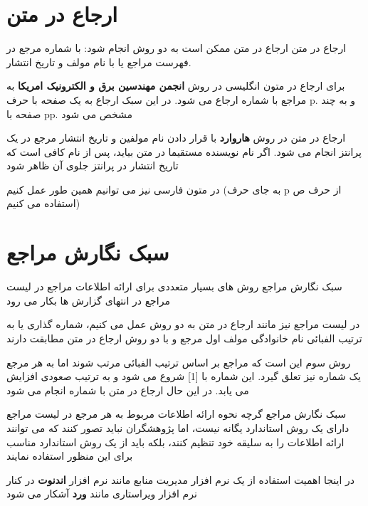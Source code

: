 \documentclass[14pt]{beamer}
\newcommand{\sectionfontsize}{\fontsize{22pt}{0pt}\selectfont}
\newcommand{\framefontsizelarge}{\fontsize{18pt}{0pt}\selectfont}
\newcommand{\frametitlefontsize}{\fontsize{20pt}{0pt}\selectfont}
\begin{document}
\begin{persian}
	\section{\sectionfontsize ارجاع در متن}	
	
	\begin{frame}[plain]{\frametitlefontsize  ارجاع در متن}
		\framefontsizelarge
		ارجاع در متن ممکن است به دو روش انجام شود: با شماره مرجع در فهرست مراجع یا با نام مولف و تاریخ انتشار. 
		
		برای ارجاع در متون انگلیسی در روش  \textbf{انجمن مهندسین برق و الکترونیک امریکا} به مراجع با شماره ارجاع می شود. در این سبک ارجاع به یک صفحه با حرف p. و به چند صفحه با pp. مشخص می شود
		
		ارجاع در متن در روش \textbf{هاروارد} با قرار دادن نام مولفین و تاریخ انتشار مرجع در یک پرانتز انجام می شود. اگر نام نویسنده مستقیما در متن بیاید، پس از نام کافی است که تاریخ انتشار در پرانتز جلوی آن ظاهر شود
		
		در متون فارسی نیز می توانیم همین طور عمل کنیم (به جای حرف p از حرف ص استفاده می کنیم)
	\end{frame}	
	
	\section{\sectionfontsize سبک نگارش مراجع}	
	
	\begin{frame}[plain]{\frametitlefontsize  سبک نگارش مراجع}
		\framefontsizelarge
		روش های بسیار متعددی برای ارائه اطلاعات مراجع در لیست مراجع در انتهای گزارش ها بکار می رود
		
		در لیست مراجع نیز مانند ارجاع در متن به دو روش عمل می کنیم، شماره گذاری یا به ترتیب الفبائی نام خانوادگی مولف اول مرجع و با دو روش ارجاع در متن مطابقت دارند 
		
		روش سوم این است که مراجع بر اساس ترتیب الفبائی مرتب شوند اما به هر مرجع یک شماره نیز تعلق گیرد. این شماره با [1] شروع می شود و به ترتیب صعودی افزایش می یابد. در این حال ارجاع در متن با شماره انجام می شود
	\end{frame}	
	
	\begin{frame}[plain]{\frametitlefontsize  سبک نگارش مراجع}
		\framefontsizelarge
		 گرچه نحوه ارائه اطلاعات مربوط به هر مرجع در لیست مراجع دارای یک روش استاندارد یگانه نیست، اما پژوهشگران نباید تصور کنند که می توانند ارائه اطلاعات را به سلیقه خود تنظیم کنند، بلکه باید از یک روش استاندارد مناسب برای این منظور استفاده نمایند
		 
		 در اینجا اهمیت استفاده از یک نرم افزار مدیریت منابع مانند نرم افزار \textbf{اندنوت} در کنار نرم افزار ویراستاری مانند \textbf{ورد} آشکار می شود
		 

\end{frame}
\end{persian}
\end{document}
